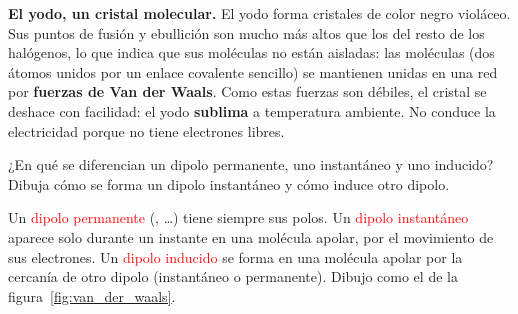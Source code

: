 \begin{remark}
    \textbf{El yodo, un cristal molecular.} El yodo forma cristales de color negro violáceo. Sus puntos de fusión y ebullición son mucho más altos que los del resto de los halógenos, lo que indica que sus moléculas no están aisladas: las moléculas  (dos átomos unidos por un enlace covalente sencillo) se mantienen unidas en una red por \textbf{fuerzas de Van der Waals}. Como estas fuerzas son débiles, el cristal se deshace con facilidad: el yodo \textbf{sublima} a temperatura ambiente. No conduce la electricidad porque no tiene electrones libres.
\end{remark}

\begin{exercise}
    ¿En qué se diferencian un dipolo permanente, uno instantáneo y uno inducido? Dibuja cómo se forma un dipolo instantáneo y cómo induce otro dipolo.
    \begin{solu}
        Un \textcolor{red}{dipolo permanente} (, \ldots) tiene siempre sus polos. Un \textcolor{red}{dipolo instantáneo} aparece solo durante un instante en una molécula apolar, por el movimiento de sus electrones. Un \textcolor{red}{dipolo inducido} se forma en una molécula apolar por la cercanía de otro dipolo (instantáneo o permanente). Dibujo como el de la figura~\ref{fig:van_der_waals}.
    \end{solu}
\end{exercise}

